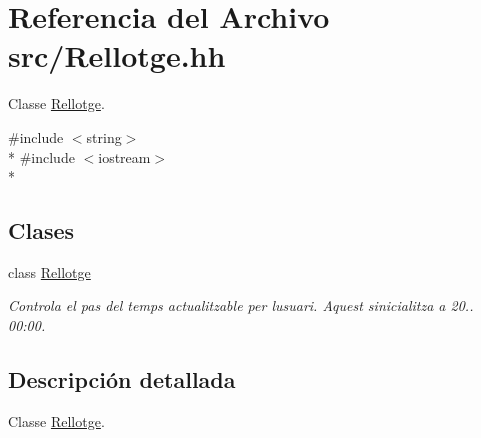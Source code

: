 \hypertarget{_rellotge_8hh}{}\section{Referencia del Archivo src/\+Rellotge.hh}
\label{_rellotge_8hh}


Classe \hyperlink{class_rellotge}{Rellotge}.  


{\ttfamily \#include $<$string$>$}\\*
{\ttfamily \#include $<$iostream$>$}\\*
\subsection*{Clases}
\begin{DoxyCompactItemize}
\item 
class \hyperlink{class_rellotge}{Rellotge}
\begin{DoxyCompactList}\small\item\em Controla el pas del temps actualitzable per l\textquotesingle{}usuari. Aquest s\textquotesingle{}inicialitza a 20.. 00\+:00. \end{DoxyCompactList}\end{DoxyCompactItemize}


\subsection{Descripción detallada}
Classe \hyperlink{class_rellotge}{Rellotge}. 

